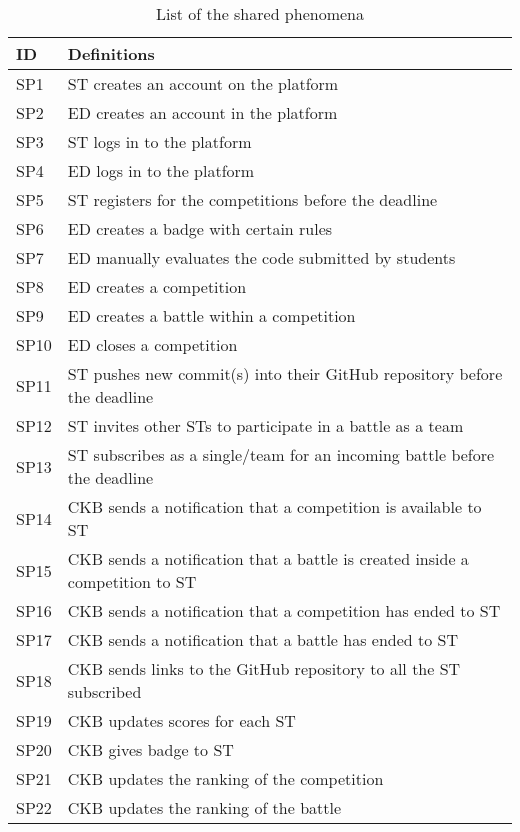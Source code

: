\begin{table}[H]
  \begin{tabular}{|l|l|}

    \hline
    \textbf{ID} & \textbf{Definitions}      \\
    \hline
    SP1 & ST creates an account on the platform \\
    \hline
    SP2 & ED creates an account in the platform \\
    \hline
    SP3 & ST logs in to the platform \\
    \hline
    SP4 & ED logs in to the platform  \\
    \hline
    SP5 & ST registers for the competitions before the deadline   \\
    \hline
    SP6 & ED creates a badge with certain rules   \\
    \hline
    SP7 & ED manually evaluates the code submitted by students   \\
    \hline
    SP8 & ED creates a competition   \\
    \hline
    SP9 & ED creates a battle within a competition   \\
    \hline
    SP10 & ED closes a competition   \\
    \hline
    SP11 & ST pushes new commit(s) into their GitHub repository before the deadline   \\
    \hline
    SP12 & ST invites other STs to participate in a battle as a team   \\
    \hline
    SP13 & ST subscribes as a single/team for an incoming battle before the deadline   \\
    \hline
    SP14 & CKB sends a notification that a competition is available to ST   \\
    \hline
    SP15 & CKB sends a notification that a battle is created inside a competition to ST   \\
    \hline
    SP16 & CKB sends a notification that a competition has ended to ST   \\
    \hline
    SP17 & CKB sends a notification that a battle has ended to ST   \\
    \hline
    SP18 & CKB sends links to the GitHub repository to all the ST subscribed   \\
    \hline
    SP19 & CKB updates scores for each ST   \\
    \hline
    SP20 & CKB gives badge to ST   \\
    \hline
    SP21 & CKB updates the ranking of the competition   \\
    \hline
    SP22 & CKB updates the ranking of the battle   \\
    \hline
    
  \end{tabular}
  \caption{List of the shared phenomena}
  \label{tab:sharedPhenomena}
\end{table}


